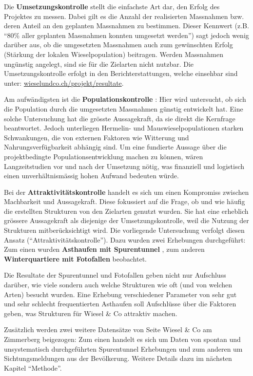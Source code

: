 \documentclass[
  oneside]{scrbook}
\begin{document}
Die \textbf{Umsetzungskontrolle} stellt die einfachste Art dar, den Erfolg des Projektes zu messen. Dabei gilt es die Anzahl der realisierten Massnahmen bzw. deren Anteil an den geplanten Massnahmen zu bestimmen. Dieser Kennwert (z.B. ``80\% aller geplanten Massnahmen konnten umgesetzt werden'') sagt jedoch wenig darüber aus, ob die umgesetzten Massnahmen auch zum gewünschten Erfolg (Stärkung der lokalen Wieselpopulation) beitragen. Werden Massnahmen ungünstig angelegt, sind sie für die Zielarten nicht nutzbar. Die Umsetzungskontrolle erfolgt in den Berichterstattungen, welche einsehbar sind unter: \href{http://www.wieselundco.ch/projekt/resultate}{wieselundco.ch/projekt/resultate}.

Am aufwändigsten ist die \textbf{Populationskontrolle} : Hier wird untersucht, ob sich die Population durch die umgesetzten Massnahmen günstig entwickelt hat. Eine solche Untersuchung hat die grösste Aussagekraft, da sie direkt die Kernfrage beantwortet. Jedoch unterliegen Hermelin- und Mauswieselpopulationen starken Schwankungen, die von externen Faktoren wie Witterung und Nahrungsverfügbarkeit abhängig sind. Um eine fundierte Aussage über die projektbedingte Populationsentwicklung machen zu können, wären Langzeitstudien vor und nach der Umsetzung nötig, was finanziell und logistisch einen unverhältnismässig hohen Aufwand bedeuten würde.

Bei der \textbf{Attraktivitätskontrolle} handelt es sich um einen Kompromiss zwischen Machbarkeit und Aussagekraft. Diese fokussiert auf die Frage, ob und wie häufig die erstellten Strukturen von den Zielarten genutzt wurden. Sie hat eine erheblich grössere Aussagekraft als diejenige der Umsetzungskontrolle, weil die Nutzung der Strukturen mitberücksichtigt wird. Die vorliegende Untersuchung verfolgt diesen Ansatz (``Attraktivitätskontrolle''). Dazu wurden zwei Erhebungen durchgeführt: Zum einen wurden \textbf{Asthaufen mit Spurentunnel} , zum anderen \textbf{Winterquartiere mit Fotofallen} beobachtet.

Die Resultate der Spurentunnel und Fotofallen geben nicht nur Aufschluss darüber, wie viele sondern auch welche Strukturen wie oft (und von welchen Arten) besucht wurden. Eine Erhebung verschiedener Parameter von sehr gut und sehr schlecht frequentierten Asthaufen soll Aufschlüsse über die Faktoren geben, was Strukturen für Wiesel \& Co attraktiv machen.

Zusätzlich werden zwei weitere Datensätze von Seite Wiesel \& Co am Zimmerberg beigezogen: Zum einen handelt es sich um Daten von spontan und unsystematisch durchgeführten Spurentunnel Erhebungen und zum anderen um Sichtungsmeldungen aus der Bevölkerung. Weitere Details dazu im nächsten Kapitel ``Methode''.
\end{document}
